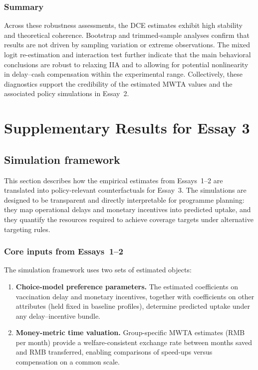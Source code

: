 \documentclass[doublespacing]{utdthesis}
\begin{document}
\subsection{Summary}
Across these robustness assessments, the DCE estimates exhibit high stability and theoretical coherence. Bootstrap and trimmed-sample analyses confirm that results are not driven by sampling variation or extreme observations. The mixed logit re-estimation and interaction test further indicate that the main behavioral conclusions are robust to relaxing IIA and to allowing for potential nonlinearity in delay--cash compensation within the experimental range. Collectively, these diagnostics support the credibility of the estimated MWTA values and the associated policy simulations in Essay~2.


\chapter{Supplementary Results for Essay 3}
\label{ch:supp_essay3}

\section{Simulation framework}
\label{sec:essay3_sim_framework}

This section describes how the empirical estimates from Essays~1--2 are translated into policy-relevant counterfactuals for Essay~3. The simulations are designed to be transparent and directly interpretable for programme planning: they map operational delays and monetary incentives into predicted uptake, and they quantify the resources required to achieve coverage targets under alternative targeting rules.

\subsection{Core inputs from Essays~1--2}
\label{subsec:essay3_inputs}

The simulation framework uses two sets of estimated objects:

\begin{enumerate}[leftmargin=*]
\item \textbf{Choice-model preference parameters.} The estimated coefficients on vaccination delay and monetary incentives, together with coefficients on other attributes (held fixed in baseline profiles), determine predicted uptake under any delay--incentive bundle.
\item \textbf{Money-metric time valuation.} Group-specific MWTA estimates (RMB per month) provide a welfare-consistent exchange rate between months saved and RMB transferred, enabling comparisons of speed-ups versus compensation on a common scale.
\end{enumerate}
\end{document}
